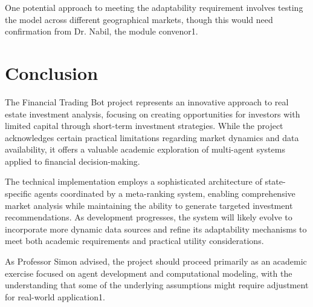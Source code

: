 One potential approach to meeting the adaptability requirement involves testing the model across different geographical markets, though this would need confirmation from Dr. Nabil, the module convenor1.


\section*{Conclusion}

The Financial Trading Bot project represents an innovative approach to real estate investment analysis, focusing on creating opportunities for investors with limited capital through short-term investment strategies. While the project acknowledges certain practical limitations regarding market dynamics and data availability, it offers a valuable academic exploration of multi-agent systems applied to financial decision-making.


The technical implementation employs a sophisticated architecture of state-specific agents coordinated by a meta-ranking system, enabling comprehensive market analysis while maintaining the ability to generate targeted investment recommendations. As development progresses, the system will likely evolve to incorporate more dynamic data sources and refine its adaptability mechanisms to meet both academic requirements and practical utility considerations.


As Professor Simon advised, the project should proceed primarily as an academic exercise focused on agent development and computational modeling, with the understanding that some of the underlying assumptions might require adjustment for real-world application1.
